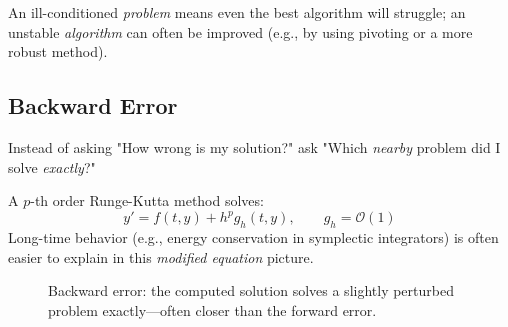 An ill-conditioned \emph{problem} means even the best algorithm will struggle; an unstable \emph{algorithm} can often be improved (e.g., by using pivoting or a more robust method).

\subsection{Backward Error}
\label{sec:backward}

Instead of asking "How wrong is my solution?" ask "Which \emph{nearby} problem did I solve \emph{exactly}?"

A $p$-th order Runge-Kutta method solves:
\[
    y' = f(t,y) + h^{p}g_h(t,y), \qquad g_h=\mathcal{O}(1)
\]
Long-time behavior (e.g., energy conservation in symplectic integrators) is often easier to explain in this \emph{modified equation} picture.
\begin{figure}[ht!]
    \centering
    \caption{Backward error: the computed solution solves a slightly perturbed problem exactly—often closer than the forward error.}
    \label{fig:backward-error}
\end{figure}

